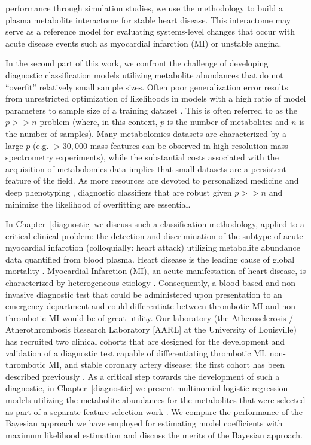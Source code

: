 \begin{DoubleSpace*}
performance through simulation studies, we use the methodology to build a plasma metabolite interactome for stable heart disease. This interactome may serve as a reference model for evaluating systems-level changes that occur with acute disease events such as myocardial infarction (MI) or unstable angina. 

In the second part of this work, we confront the challenge of developing diagnostic classification models utilizing metabolite abundances that do not ``overfit'' relatively small sample sizes. Often poor generalization error results from unrestricted optimization of likelihoods in models with a high ratio of model parameters to sample size of a training dataset \cite{hastie2009}. This is often referred to as the $p>>n$ problem (where, in this context, $p$ is the number of metabolites and $n$ is the number of samples). Many metabolomics datasets are characterized by a large $p$ (e.g. $>30,000$ mass features can be observed in high resolution mass spectrometry experiments), while the substantial costs associated with the acquisition of metabolomics data implies that small datasets are a persistent feature of the field. As more resources are devoted to personalized medicine \cite{hamburg2010,wishart2016} and deep phenotyping \cite{delude2015}, diagnostic classifiers that are robust given $p>>n$ and minimize the likelihood of overfitting are essential. 

In Chapter~\ref{diagnostic} we discuss such a classification methodology, applied to a critical clinical problem: the detection and discrimination of the subtype of acute myocardial infarction (colloquially: heart attack) utilizing metabolite abundance data quantified from blood plasma. Heart disease is the leading cause of global mortality \cite{benjamin2017}. Myocardial Infarction (MI), an acute manifestation of heart disease, is characterized by heterogeneous etiology \cite{thygesen2012}. Consequently, a blood-based and non-invasive diagnostic test that could be administered upon presentation to an emergency department and could differentiate between thrombotic MI and non-thrombotic MI would be of great utility. Our laboratory (the Atherosclerosis / Atherothrombosis Research Laboratory [AARL] at the University of Louisville) has recruited two clinical cohorts that are designed for the development and validation of a diagnostic test capable of differentiating thrombotic MI, non-thrombotic MI, and stable coronary artery disease; the first cohort has been described previously \cite{defilippis2015,defilippis2017,trainor2017}. As a critical step towards the development of such a diagnostic, in Chapter~\ref{diagnostic} we present multinomial logistic regression models utilizing the metabolite abundances for the metabolites that were selected as part of a separate feature selection work \cite{trainor2018}. We compare the performance of the Bayesian approach we have employed for estimating model coefficients with maximum likelihood estimation and discuss the merits of the Bayesian approach. 


\end{DoubleSpace*}
